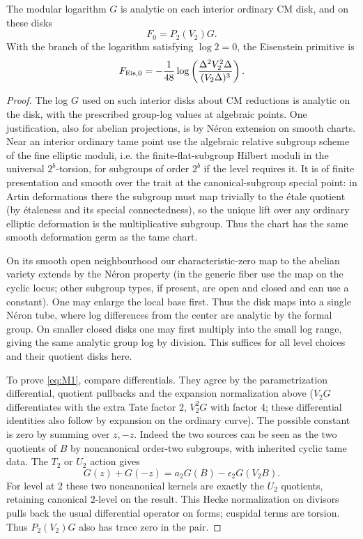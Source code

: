 \begin{lemma}
\label{split-measures:logarithmic-primitive}
The modular logarithm \(G\) is analytic on each interior ordinary CM disk,
and on these disks
\[
 F_0=P_2(V_2)G.
 \tag{M1}\label{eq:M1}
\]
With the branch of the logarithm satisfying \(\log 2=0\), the Eisenstein
primitive is
\[
 F_{{\rm Eis},0}
   =-\frac1{48}\log\left(
      \frac{\Delta^2V_2^2\Delta}{(V_2\Delta)^3}\right).
\]
\end{lemma}
\begin{proof}
The log \(G\) used on such interior disks about CM reductions is analytic on the disk, with the prescribed group-log values at algebraic points. One justification, also for abelian projections, is by Néron extension on smooth charts. Near an interior ordinary tame point use the algebraic relative subgroup scheme of the fine elliptic moduli, i.e. the finite-flat-subgroup Hilbert moduli in the universal \(2^b\)-torsion, for subgroups of order \(2^b\) if the level requires it. It is of finite presentation and smooth over the trait at the canonical-subgroup special point: in Artin deformations there the subgroup must map trivially to the étale quotient (by étaleness and its special connectedness), so the unique lift over any ordinary elliptic deformation is the multiplicative subgroup. Thus the chart has the same smooth deformation germ as the tame chart. 

On its smooth open neighbourhood our characteristic-zero map to the abelian variety extends by the Néron property (in the generic fiber use the map on the cyclic locus; other subgroup types, if present, are open and closed and can use a constant). One may enlarge the local base first. Thus the disk maps into a single Néron tube, where log differences from the center are analytic by the formal group. On smaller closed disks one may first multiply into the small log range, giving the same analytic group log by division. This suffices for all level choices and their quotient disks here.

To prove \eqref{eq:M1}, compare differentials.  They agree by the parametrization differential, quotient pullbacks and the expansion normalization above (\(V_2 G\) differentiates with the extra Tate factor 2, \(V_2^2G\) with factor 4; these differential identities also follow by expansion on the ordinary curve). The possible constant is zero by summing over \(z,-z\). Indeed the two sources can be seen as the two quotients of \(B\) by noncanonical order-two subgroups, with inherited cyclic tame data. The \(T_2\) or \(U_2\) action gives
\[
                      G(z)+G(-z)=a_2 G(B)-\epsilon_2 G(V_2 B).
\]
For level at 2 these two noncanonical kernels are exactly the \(U_2\) quotients, retaining canonical \(2\)-level on the result. This Hecke normalization on divisors pulls back the usual differential operator on forms; cuspidal terms are torsion. Thus \(P_2(V_2)G\) also has trace zero in the pair.


\end{proof}
